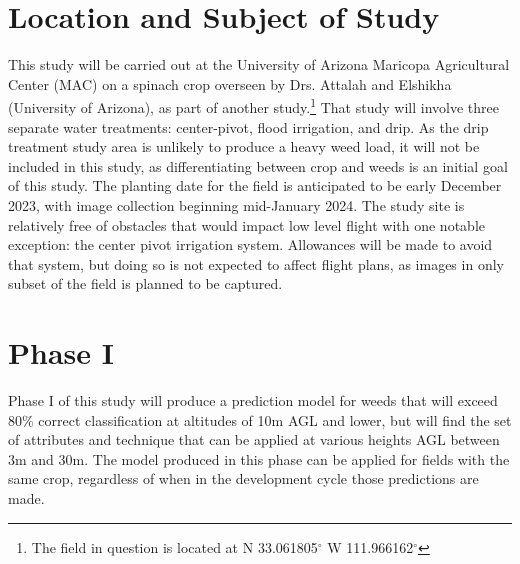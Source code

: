 \documentclass[12pt]{article}
\begin{document}
\section{Location and Subject of Study}
This study will be carried out at the University of Arizona Maricopa Agricultural Center (MAC) on a spinach crop overseen by Drs. Attalah and Elshikha (University of Arizona), as part of another study.\footnote{The field in question is located at N 33.061805$^{\circ}$ W 111.966162$^{\circ}$} That study will involve three separate water treatments: center-pivot, flood irrigation, and drip. As the drip treatment study area is unlikely to produce a heavy weed load, it will not be included in this study, as differentiating between crop and weeds is an initial goal of this study. The planting date for the field is anticipated to be early December 2023, with image collection beginning mid-January 2024. The study site is relatively free of obstacles that would impact low level flight with one notable exception: the center pivot irrigation system. Allowances will be made to avoid that system, but doing so is not expected to affect flight plans, as images in only subset of the field is planned to be captured.
 
\section{Phase I}
Phase I of this study will produce a prediction model for weeds that will exceed 80\% correct classification at altitudes of 10m AGL and lower, but will find the set of attributes and technique that can be applied at various heights AGL between 3m and 30m. The model produced in this phase can be applied for fields with the same crop, regardless of when in the development cycle those predictions are made. 
\end{document}
